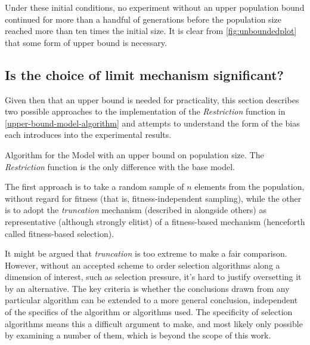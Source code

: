 Under these initial conditions, no experiment without an upper population bound continued for more than a handful of generations before the population size reached more than ten times the initial size. It is clear from \cref{fig:unboundedplot} that some form of upper bound is necessary.

\subsection[Choice of limit mechanism]{Is the choice of limit mechanism significant?}

Given then that an upper bound is needed for practicality, this section describes two possible approaches to the implementation of the \emph{Restriction} function in \ref{upper-bound-model-algorithm} and attempts to understand the form of the bias each introduces into the experimental results.

\begin{algorithm}
	\caption{Algorithm for the Model with an upper bound on population size. The \emph{Restriction} function is the only difference with the base model.}\label{upper-bound-model-algorithm}
\end{algorithm}

The first approach is to take a random sample of $n$ elements from the population, without regard for fitness (that is, fitness-independent sampling), while the other is to adopt the \emph{truncation} mechanism (described in \cite[124]{DeJong2006} alongside others) as representative (although strongly elitist) of a fitness-based mechanism (henceforth called fitness-based selection).

It might be argued that \emph{truncation} is too extreme to make a fair comparison. However, without an accepted scheme to order selection algorithms along a dimension of interest, such as selection pressure, it's hard to justify oversetting it by an alternative. The key criteria is whether the conclusions drawn from any particular algorithm can be extended to a more general conclusion, independent of the specifics of the algorithm or algorithms used. The specificity of selection algorithms means this a difficult argument to make, and most likely only possible by examining a number of them, which is beyond the scope of this work.

